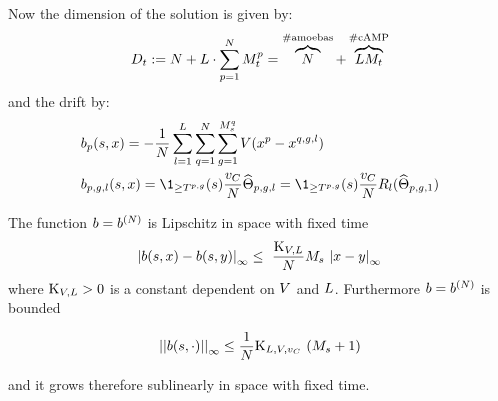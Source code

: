 \begin{remark}
	Now the dimension of the solution is given by:
	\begin{equation*}
		D_t := N + L\cdot\sum_{p=1}^N M_t^p = \overbrace{N}^{\# \text{amoebas}} + \overbrace{L M_t}^{\# \text{cAMP}}
	\end{equation*}
	and the drift by:
	\begin{align*}
		&\drift_{p} (s,x) = - \frac{1}{N} \sum _{l = 1}^{\NumCampRelease} \sum _{q = 1}^{N} \sum_{g = 1}^{\hmactive_s^q} \attraction(x^p - x^{q,g,l})
		\\
		&
		\drift_{p,g,l} (s, x) = \1_{\geq \btime^{p,g}}(s)  \frac{\cdrift}{N}  \cgonia_{p,g,l} = \1_{\geq \btime^{p,g}}(s)  \frac{\cdrift}{N}  \rotation_l (\cgonia_{p,g,1}) 
	\end{align*}
\end{remark}

\begin{lemma}\label{ch7:lemma:drift:lip-and-bound}
	The function $b = b^{(N)}$ is Lipschitz in space with fixed time
	\begin{equation*}
		{ \left| b(s,x) - b(s,y) \right|_{\infty} }
		\leq\
		\frac{\text{K}_{V,L}}{N}
		M_s\
		{ \left| x-y \right|_{\infty} }
	\end{equation*}
	where $\text{K}_{V,L} >0$ is a constant dependent on $V$ and $L$.
	Furthermore $b = b^{(N)}$ is bounded
	
	\begin{equation*}
		\left|\left| b(s,\cdot) \right|\right|_\infty \leq 
		\frac{1}{N}
		\text{K}_{L, V,v_C}\
		(M_s + 1)
	\end{equation*}
	
	and it grows therefore sublinearly in space with fixed time.
\end{lemma}


